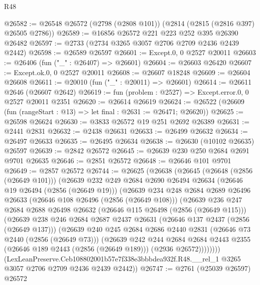 \begin{lexlean}{R48}
\begin{coremodule}
@26582 := @26548 @26572 (@2798 (@2808 @101)) (@2814 (@2815 (@2816 @397) @26505 @2786))
@26589 := @16856 @26572 @221 @223 @252 @395 @26390 @26482
@26597 := @2733 (@2734 @3265 @3057 @2706 @2709 @2436 @2439 @2442)
@26598 := @26589 @26597
@26601 := Except.{0, 0} @2527 @20011
@26603 := @26406 (fun ("_" : @26407) => @26601)
@26604 := @26603 @26420
@26607 := Except.ok.{0, 0} @2527 @20011
@26608 := @26607 @18248
@26609 := @26604 @26608
@26611 := @20010 (fun ("_" : @20011) => @26601)
@26614 := @26611 @2646 (@26607 @2642)
@26619 := fun (problem : @2527) => Except.error.{0, 0} @2527 @20011 @2351
@26620 := @26614 @26619
@26624 := @26522 (@26609 (fun (rangeStart : @13) => let final : @2631 := @26471; @26620))
@26625 := @26598 @26624
@26630 := @3833 @26572 @19 @251 @2692 @26389
@26631 := @2441 @2831
@26632 := @2438 @26631
@26633 := @26499 @26632
@26634 := @26497 @26633
@26635 := @26495 @26634
@26638 := @26630 (@10102 @26635) @26597
@26639 := @2842 @26572
@26645 := @26639 @230 @250 @2684 @2691 @9701 @26635
@26646 := @2851 @26572
@26648 := @26646 @101 @9701
@26649 := @2857 @26572
@26744 := @26625
    (@26638
      (@26645
        (@26648 (@2856 (@26649 @101)))
        (@26639
          @232
          @249
          @2684
          @2690
          @26494
          @26634
          (@26646 @19 @26494 (@2856 (@26649 @19)))
          (@26639
            @234
            @248
            @2684
            @2689
            @26496
            @26633
            (@26646 @108 @26496 (@2856 (@26649 @108)))
            (@26639
              @236
              @247
              @2684
              @2688
              @26498
              @26632
              (@26646 @115 @26498 (@2856 (@26649 @115)))
              (@26639
                @238
                @246
                @2684
                @2687
                @2437
                @26631
                (@26646 @137 @2437 (@2856 (@26649 @137)))
                (@26639
                  @240
                  @245
                  @2684
                  @2686
                  @2440
                  @2831
                  (@26646 @73 @2440 (@2856 (@26649 @73)))
                  (@26639
                    @242
                    @244
                    @2684
                    @2684
                    @2443
                    @2355
                    (@26646 @189 @2443 (@2856 (@26649 @189)))
                    (@2936 @26572))))))))
      (LexLeanPreserve.Ceb108802001b57e7f338e3bbbdea932f.R48.__rel_1
        @3265
        @3057
        @2706
        @2709
        @2436
        @2439
        @2442))
@26747 := @2761 (@25039 @26597) @26572

\end{coremodule}
\end{lexlean}
